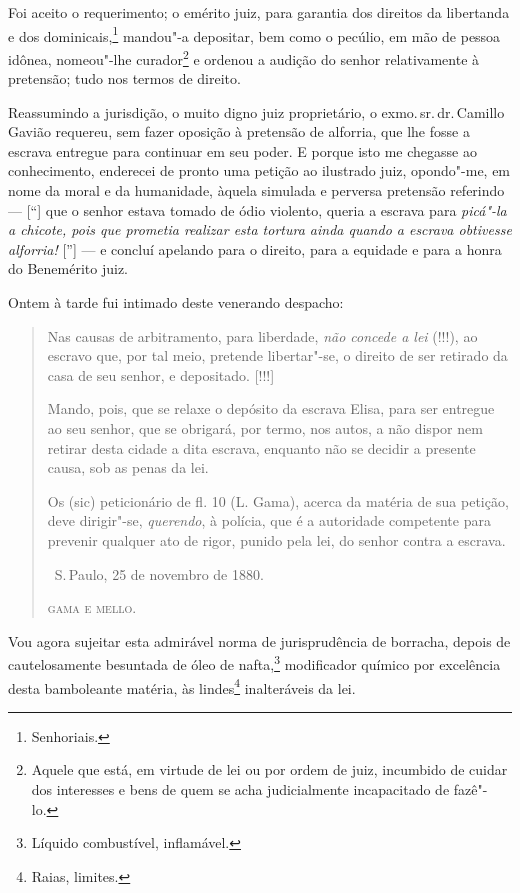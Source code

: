 Foi aceito o requerimento; o emérito juiz, para garantia dos direitos da
libertanda e dos dominicais,\footnote{Senhoriais.} mandou"-a depositar,
bem como o pecúlio, em mão de pessoa idônea, nomeou"-lhe
curador\footnote{Aquele que está, em virtude de lei ou por ordem de
  juiz, incumbido de cuidar dos interesses e bens de quem se acha
  judicialmente incapacitado de fazê"-lo.} e ordenou a audição do senhor
relativamente à pretensão; tudo nos termos de direito.

Reassumindo a jurisdição, o muito digno juiz proprietário, o exmo.\,sr.\,dr.\,Camillo Gavião requereu, sem fazer oposição à pretensão de alforria,
que lhe fosse a escrava entregue para continuar em seu poder. E porque
isto me chegasse ao conhecimento, enderecei de pronto uma petição ao
ilustrado juiz, opondo"-me, em nome da moral e da humanidade, àquela
simulada e perversa pretensão referindo --- {[}``{]} que o senhor estava
tomado de ódio violento, queria a escrava para \emph{picá"-la a chicote,
pois que prometia realizar esta tortura ainda quando a escrava obtivesse
alforria!} {[}''{]} --- e concluí apelando para o direito, para a equidade
e para a honra do Benemérito juiz.

Ontem à tarde fui intimado deste venerando despacho:

\begin{quote}
Nas causas de arbitramento, para liberdade, \emph{não concede a lei}
(!!!), ao escravo que, por tal meio, pretende libertar"-se, o direito de
ser retirado da casa de seu senhor, e depositado. {[}!!!{]}

Mando, pois, que se relaxe o depósito da escrava Elisa, para ser
entregue ao seu senhor, que se obrigará, por termo, nos autos, a não
dispor nem retirar desta cidade a dita escrava, enquanto não se decidir
a presente causa, sob as penas da lei.

Os (sic) peticionário de fl. 10 (L. Gama), acerca da matéria de sua
petição, deve dirigir"-se, \emph{querendo}, à polícia, que é a autoridade
competente para prevenir qualquer ato de rigor, punido pela lei, do
senhor contra a escrava.

\medskip

\hfill\ S.\,Paulo, 25 de novembro de 1880.\smallskip

\hfill\textsc{gama e mello.}
\end{quote}

\asterisc

Vou agora sujeitar esta admirável norma de jurisprudência de borracha,
depois de cautelosamente besuntada de óleo de nafta,\footnote{Líquido
  combustível, inflamável.} modificador químico por excelência desta
bamboleante matéria, às lindes\footnote{Raias, limites.} inalteráveis
da lei.

